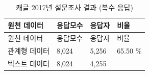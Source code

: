 \documentclass[smallextended]{svjour3}       %
\begin{document}
\begin{longtable}[]{@{}llll@{}}
\caption{캐글 2017년 설문조사 결과 (복수 응답)}\tabularnewline
\toprule
\begin{minipage}[b]{0.20\columnwidth}\raggedright
원천 데이터\strut
\end{minipage} & \begin{minipage}[b]{0.14\columnwidth}\raggedright
응답모수\strut
\end{minipage} & \begin{minipage}[b]{0.11\columnwidth}\raggedright
응답자\strut
\end{minipage} & \begin{minipage}[b]{0.12\columnwidth}\raggedright
비율\strut
\end{minipage}\tabularnewline
\midrule
\endfirsthead
\toprule
\begin{minipage}[b]{0.20\columnwidth}\raggedright
원천 데이터\strut
\end{minipage} & \begin{minipage}[b]{0.14\columnwidth}\raggedright
응답모수\strut
\end{minipage} & \begin{minipage}[b]{0.11\columnwidth}\raggedright
응답자\strut
\end{minipage} & \begin{minipage}[b]{0.12\columnwidth}\raggedright
비율\strut
\end{minipage}\tabularnewline
\midrule
\endhead
\begin{minipage}[t]{0.20\columnwidth}\raggedright
관계형 데이터\strut
\end{minipage} & \begin{minipage}[t]{0.14\columnwidth}\raggedright
8,024\strut
\end{minipage} & \begin{minipage}[t]{0.11\columnwidth}\raggedright
5,256\strut
\end{minipage} & \begin{minipage}[t]{0.12\columnwidth}\raggedright
65.50 \%\strut
\end{minipage}\tabularnewline
\begin{minipage}[t]{0.20\columnwidth}\raggedright
텍스트 데이터\strut
\end{minipage} & \begin{minipage}[t]{0.14\columnwidth}\raggedright
8,024\strut
\end{minipage} & \begin{minipage}[t]{0.11\columnwidth}\raggedright
4,255\strut
\end{minipage} & \begin{minipage}[t]{0.12\columnwidth}\raggedright

\end{minipage}
\end{longtable}
\end{document}
